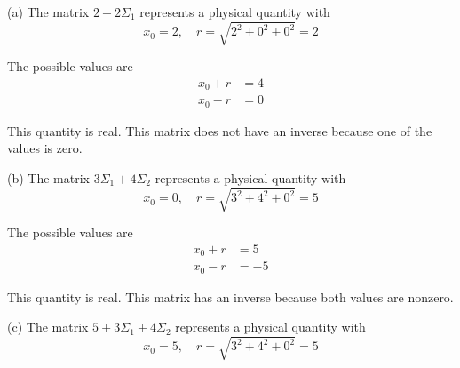 


\bigskip
(a) The matrix $2+2\Sigma_1$ represents a physical quantity with
\begin{equation*}
x_0=2,\quad r=\sqrt{2^2+0^2+0^2}=2
\end{equation*}

The possible values are
\begin{equation*}
\begin{aligned}
x_0+r&=4
\\
x_0-r&=0
\end{aligned}
\end{equation*}

This quantity is real.
This matrix does not have an inverse because one of the values is zero.

\bigskip
(b) The matrix $3\Sigma_1+4\Sigma_2$ represents a physical quantity with
\begin{equation*}
x_0=0,\quad r=\sqrt{3^2+4^2+0^2}=5
\end{equation*}

The possible values are
\begin{equation*}
\begin{aligned}
x_0+r&=5
\\
x_0-r&=-5
\end{aligned}
\end{equation*}

This quantity is real.
This matrix has an inverse because both values are nonzero.

\bigskip
(c) The matrix $5+3\Sigma_1+4\Sigma_2$ represents a physical quantity with
\begin{equation*}
x_0=5,\quad r=\sqrt{3^2+4^2+0^2}=5
\end{equation*}

